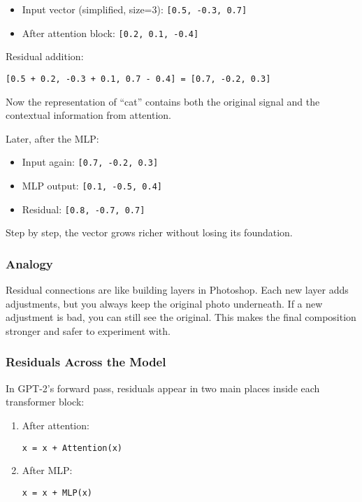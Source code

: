 \documentclass[
  letterpaper,
  DIV=11,
  numbers=noendperiod]{scrreprt}
\providecommand{\tightlist}{%
  \setlength{\itemsep}{0pt}\setlength{\parskip}{0pt}}
\begin{document}
\begin{itemize}
\tightlist
\item
  Input vector (simplified, size=3): \texttt{{[}0.5,\ -0.3,\ 0.7{]}}
\item
  After attention block: \texttt{{[}0.2,\ 0.1,\ -0.4{]}}
\end{itemize}

Residual addition:

\begin{verbatim}
[0.5 + 0.2, -0.3 + 0.1, 0.7 - 0.4] = [0.7, -0.2, 0.3]
\end{verbatim}

Now the representation of ``cat'' contains both the original signal and
the contextual information from attention.

Later, after the MLP:

\begin{itemize}
\tightlist
\item
  Input again: \texttt{{[}0.7,\ -0.2,\ 0.3{]}}
\item
  MLP output: \texttt{{[}0.1,\ -0.5,\ 0.4{]}}
\item
  Residual: \texttt{{[}0.8,\ -0.7,\ 0.7{]}}
\end{itemize}

Step by step, the vector grows richer without losing its foundation.

\subsubsection{Analogy}\label{analogy-2}

Residual connections are like building layers in Photoshop. Each new
layer adds adjustments, but you always keep the original photo
underneath. If a new adjustment is bad, you can still see the original.
This makes the final composition stronger and safer to experiment with.

\subsubsection{Residuals Across the
Model}\label{residuals-across-the-model}

In GPT-2's forward pass, residuals appear in two main places inside each
transformer block:

\begin{enumerate}
\def\labelenumi{\arabic{enumi}.}
\item
  After attention:

\begin{verbatim}
x = x + Attention(x)
\end{verbatim}
\item
  After MLP:

\begin{verbatim}
x = x + MLP(x)
\end{verbatim}
\end{enumerate}
\end{document}

